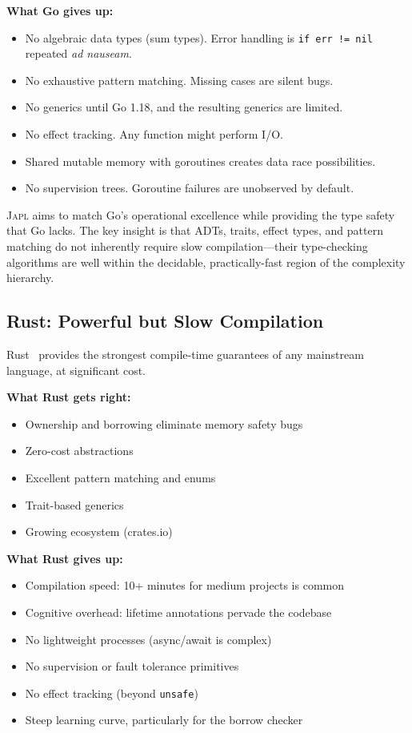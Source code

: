 \documentclass[11pt,twocolumn]{article}
\newcommand{\japl}{\textsc{Japl}}
\begin{document}
\textbf{What Go gives up:}
\begin{itemize}[leftmargin=*]
\item No algebraic data types (sum types). Error handling is \texttt{if err != nil} repeated \emph{ad nauseam}.
\item No exhaustive pattern matching. Missing cases are silent bugs.
\item No generics until Go 1.18, and the resulting generics are limited.
\item No effect tracking. Any function might perform I/O.
\item Shared mutable memory with goroutines creates data race possibilities.
\item No supervision trees. Goroutine failures are unobserved by default.
\end{itemize}

\japl{} aims to match Go's operational excellence while providing the type safety that Go lacks.
The key insight is that ADTs, traits, effect types, and pattern matching do not inherently require slow compilation---their type-checking algorithms are well within the decidable, practically-fast region of the complexity hierarchy.

\subsection{Rust: Powerful but Slow Compilation}

Rust~\citep{matsakis2014rust,klabnik2019rust} provides the strongest compile-time guarantees of any mainstream language, at significant cost.

\textbf{What Rust gets right:}
\begin{itemize}[leftmargin=*]
\item Ownership and borrowing eliminate memory safety bugs
\item Zero-cost abstractions
\item Excellent pattern matching and enums
\item Trait-based generics
\item Growing ecosystem (crates.io)
\end{itemize}

\textbf{What Rust gives up:}
\begin{itemize}[leftmargin=*]
\item Compilation speed: 10+ minutes for medium projects is common
\item Cognitive overhead: lifetime annotations pervade the codebase
\item No lightweight processes (async/await is complex)
\item No supervision or fault tolerance primitives
\item No effect tracking (beyond \texttt{unsafe})
\item Steep learning curve, particularly for the borrow checker
\end{itemize}
\end{document}
